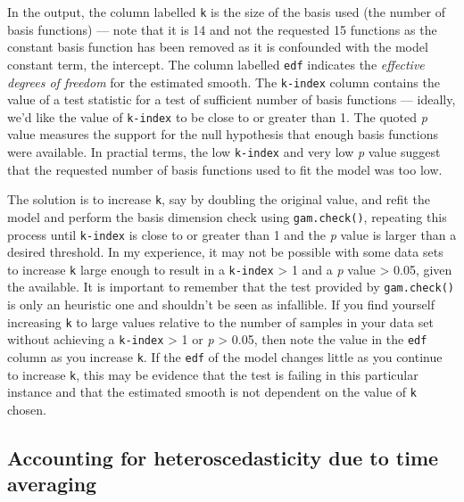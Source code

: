 \documentclass[12pt,]{article}
\begin{document}
In the output, the column labelled \texttt{k\textquotesingle{}} is the
size of the basis used (the number of basis functions) --- note that it
is 14 and not the requested 15 functions as the constant basis function
has been removed as it is confounded with the model constant term, the
intercept. The column labelled \texttt{edf} indicates the
\emph{effective degrees of freedom} for the estimated smooth. The
\texttt{k-index} column contains the value of a test statistic for a
test of sufficient number of basis functions --- ideally, we'd like the
value of \texttt{k-index} to be close to or greater than 1. The quoted
\emph{p} value measures the support for the null hypothesis that enough
basis functions were available. In practial terms, the low
\texttt{k-index} and very low \emph{p} value suggest that the requested
number of basis functions used to fit the model was too low.

The solution is to increase \texttt{k}, say by doubling the original
value, and refit the model and perform the basis dimension check using
\texttt{gam.check()}, repeating this process until \texttt{k-index} is
close to or greater than 1 and the \emph{p} value is larger than a
desired threshold. In my experience, it may not be possible with some
data sets to increase \texttt{k} large enough to result in a
\texttt{k-index} \textgreater{} 1 and a \emph{p} value \textgreater{}
0.05, given the available. It is important to remember that the test
provided by \texttt{gam.check()} is only an heuristic one and shouldn't
be seen as infallible. If you find yourself increasing \texttt{k} to
large values relative to the number of samples in your data set without
achieving a \texttt{k-index} \textgreater{} 1 or \emph{p} \textgreater{}
0.05, then note the value in the \texttt{edf} column as you increase
\texttt{k}. If the \texttt{edf} of the model changes little as you
continue to increase \texttt{k}, this may be evidence that the test is
failing in this particular instance and that the estimated smooth is not
dependent on the value of \texttt{k} chosen.

\subsection{Accounting for heteroscedasticity due to time
averaging}\label{accounting-for-heteroscedasticity-due-to-time-averaging}
\end{document}
